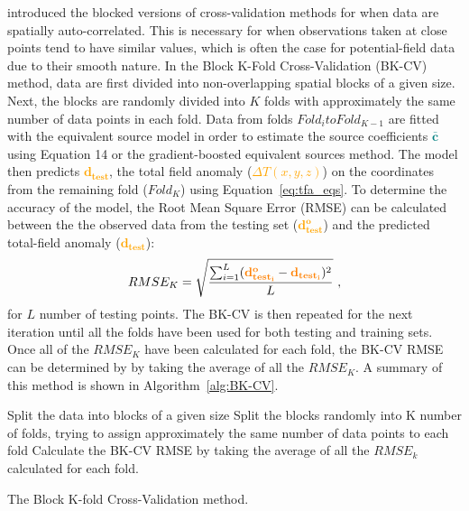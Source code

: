 \citet{Roberts2017} introduced the blocked versions of cross-validation methods for when data are spatially auto-correlated. This is necessary for when observations taken at close points tend to have similar values, which is often the case for potential-field data due to their smooth nature. In the Block K-Fold Cross-Validation (BK-CV) method, data are first divided into non-overlapping spatial blocks of a given size. Next, the blocks are randomly divided into $K$ folds with approximately the same number of data points in each fold. Data from folds $Fold_i to Fold_{K-1}$ are fitted with the equivalent source model in order to estimate the source coefficients \textcolor{teal}{$\bar{\mathbf{c}}$} using Equation 14 or the gradient-boosted equivalent sources method. The model then predicts \textcolor{orange}{$\mathbf{d_{test}}$}, the total field anomaly (\textcolor{orange}{$\Delta T (x, y, z)$}) on the coordinates from the remaining fold ($Fold_K$) using Equation~\ref{eq:tfa_eqs}. To determine the accuracy of the model, the Root Mean Square Error (RMSE) can be calculated between the the observed data from the testing set (\textcolor{orange}{$\mathbf{d^o_{test}}$}) and the predicted total-field anomaly (\textcolor{orange}{$\mathbf{d_{test}}$}):
\begin{equation}
    \label{eq:rmse}
    RMSE_K = \sqrt{\frac{\sum_{i=1}^L (\textcolor{orange}{\mathbf{d^o_{test_i}}} - \textcolor{orange}{\mathbf{d_{test_i}}})^2}{L}}
    \ ,
\end{equation}
 for $L$ number of testing points. The BK-CV is then repeated for the next iteration until all the folds have been used for both testing and training sets. Once all of the $RMSE_K$ have been calculated for each fold, the BK-CV RMSE can be determined by by taking the average of all the $RMSE_K$. A summary of this method is shown in Algorithm~\ref{alg:BK-CV}.


\begin{algorithm}[!h]
    Split the data into blocks of a given size
    \;
    Split the blocks randomly into K number of folds, trying to assign approximately the same number of data points to each fold
    \;
    Calculate the BK-CV RMSE by taking the average of all the $RMSE_k$ calculated for each fold.
    \BlankLine
    \caption{The Block K-fold Cross-Validation method.}
    \label{alg:BK-CV}
\end{algorithm}

